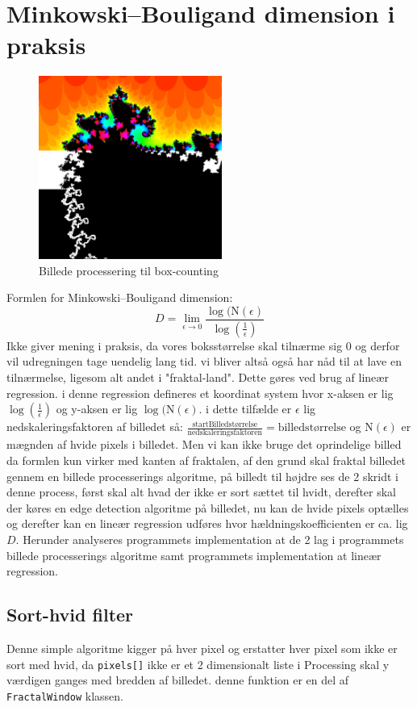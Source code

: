 \documentclass{article}
\begin{document}
\section{Minkowski–Bouligand dimension i praksis}
\begin{figure}
\includegraphics[width=6cm]{dimansion.png}
\caption{Billede processering til box-counting}\label{wrap-fig:idk}
\end{figure}
Formlen for Minkowski–Bouligand dimension: $$D = \lim_{\epsilon\to0} \frac{\log(\text{N}(\epsilon)}{\log(\frac{1}{\epsilon})}$$ Ikke giver mening i praksis, da vores boksstørrelse skal tilnærme sig 0 og derfor vil udregningen tage uendelig lang tid. vi bliver altså også har nåd til at lave en tilnærmelse, ligesom alt andet i "fraktal-land". Dette gøres ved brug af lineær regression. i denne regression defineres et koordinat system hvor x-aksen er lig $\log(\frac{1}{\epsilon})$ og y-aksen er lig $\log(\text{N}(\epsilon)$. i dette tilfælde er $\epsilon$ lig nedskaleringsfaktoren af billedet så: $\frac{\text{startBilledstørrelse}}{\text{nedskaleringsfaktoren}}=\text{billedstørrelse}$ og $\text{N}(\epsilon)$ er mægnden af hvide pixels i billedet. Men vi kan ikke bruge det oprindelige billed da formlen kun virker med kanten af fraktalen, af den grund skal fraktal billedet gennem en billede processerings algoritme, på billedt til højdre ses de 2 skridt i denne process, først skal alt hvad der ikke er sort sættet til hvidt, derefter skal der køres en edge detection algoritme på billedet, nu kan de hvide pixels optælles og derefter kan en lineær regression udføres hvor hældningskoefficienten er ca. lig $D$. Herunder analyseres programmets implementation at de 2 lag i programmets billede processerings algoritme samt programmets implementation at lineær regression.
\newpage
\subsection{Sort-hvid filter}

Denne simple algoritme kigger på hver pixel og erstatter hver pixel som ikke er sort med hvid, da \texttt{pixels[]} ikke er et 2 dimensionalt liste i Processing skal y værdigen ganges med bredden af billedet. denne funktion er en del af \texttt{FractalWindow} klassen.\\\\
\end{document}
